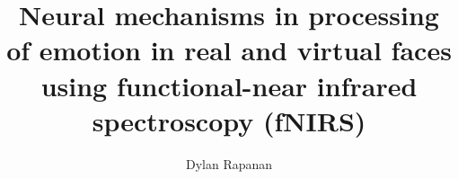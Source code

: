 \author{Dylan Rapanan}
\title{Neural mechanisms in processing of emotion in real and virtual faces using functional-near infrared spectroscopy (fNIRS)}



%
\setcounter{tocdepth}{3}







